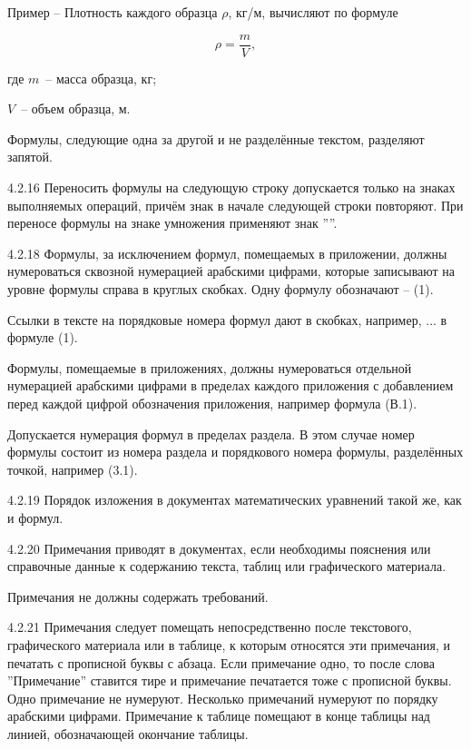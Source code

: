 Пример – Плотность каждого образца $\rho$, кг/м\textthreesuperior , вычисляют по формуле

\begin{equation*}
\rho = \frac{m}{V},  \tag{1}
\end{equation*}
\par где  $m$~– масса образца, кг;
\par $V$~– объем образца, м\textthreesuperior.

Формулы, следующие одна за другой и не разделённые текстом, разделяют запятой.

4.2.16 Переносить формулы на следующую строку допускается только на знаках выполняемых операций, причём знак в начале следующей строки повторяют. При переносе формулы на знаке умножения применяют знак ''\texttimes''.

4.2.18 Формулы, за исключением формул, помещаемых в приложении, должны нумероваться сквозной нумерацией арабскими цифрами, которые записывают на уровне формулы справа в круглых скобках. Одну формулу обозначают – (1).

Ссылки в тексте на порядковые номера формул дают в скобках, например, ... в формуле (1).

Формулы, помещаемые в приложениях, должны нумероваться отдельной нумерацией арабскими цифрами в пределах каждого приложения с добавлением перед каждой цифрой обозначения приложения, например формула (В.1).

Допускается нумерация формул в пределах раздела. В этом случае номер формулы состоит из номера раздела и порядкового номера формулы, разделённых точкой, например (3.1).

4.2.19 Порядок изложения в документах математических уравнений такой же, как и формул.

4.2.20 Примечания приводят в документах, если необходимы пояснения или справочные данные к содержанию текста, таблиц или графического материала.

Примечания не должны содержать требований.

4.2.21 Примечания следует помещать непосредственно после текстового, графического материала или в таблице, к которым относятся эти примечания, и печатать с прописной буквы с абзаца. Если примечание одно, то после слова ''Примечание'' ставится тире и примечание печатается тоже с прописной буквы. Одно примечание не нумеруют. Несколько примечаний нумеруют по порядку арабскими цифрами. Примечание к таблице помещают в конце таблицы над линией, обозначающей окончание таблицы.


